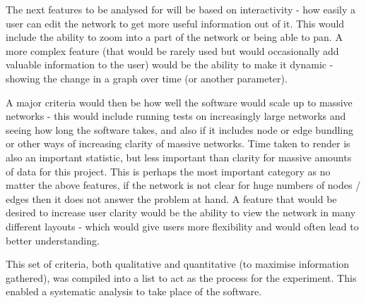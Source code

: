 \documentclass[../dissertation.tex]{subfiles}
\begin{document}
The next features to be analysed for will be based on interactivity - how easily a user can edit the network to get more useful information out of it. This would include the ability to zoom into a part of the network or being able to pan. A more complex feature (that would be rarely used but would occasionally add valuable information to the user) would be the ability to make it dynamic - showing the change in a graph over time (or another parameter). 

A major criteria would then be how well the software would scale up to massive networks - this would include running tests on increasingly large networks and seeing how long the software takes, and also if it includes node or edge bundling or other ways of increasing clarity of massive networks. Time taken to render is also an important statistic, but less important than clarity for massive amounts of data for this project. This is perhaps the most important category as no matter the above features, if the network is not clear for huge numbers of nodes / edges then it does not answer the problem at hand. A feature that would be desired to increase user clarity would be the ability to view the network in many different layouts - which would give users more flexibility and would often lead to better understanding. 

This set of criteria, both qualitative and quantitative (to maximise information gathered), was compiled into a list to act as the process for the experiment. This enabled a systematic analysis to take place of the software.
\end{document}
